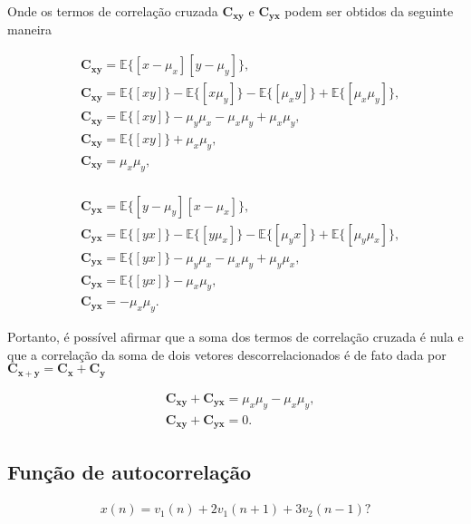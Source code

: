         Onde os termos de correlação cruzada $\mathbf{C}_{\mathbf{xy}}$ e $\mathbf{C}_{\mathbf{yx}}$ podem ser obtidos  da seguinte maneira
        
        \begin{align}
            &\mathbf{C_{xy}} = \mathbb{E}\{[x - \mu_{x}][y - \mu_{y}]\}, \\
            &\mathbf{C_{xy}} = \mathbb{E}\{[xy]\} - \mathbb{E}\{[x\mu_{y}]\} - \mathbb{E}\{[\mu_{x} y]\} + \mathbb{E}\{[\mu_{x} \mu_{y}]\}, \\
            &\mathbf{C_{xy}} = \mathbb{E}\{[xy]\} - \mu_{y} \mu_{x} - \mu_{x} \mu_{y} + \mu_{x} \mu_{y}, \\
            &\mathbf{C_{xy}} = \mathbb{E}\{[xy]\} + \mu_{x} \mu_{y}, \\
            &\mathbf{C_{xy}} = \mu_{x} \mu_{y}, \\
        \end{align}
        
        \begin{align}
            &\mathbf{C_{yx}} = \mathbb{E}\{[y - \mu_{y}][x - \mu_{x}]\}, \\
            &\mathbf{C_{yx}} = \mathbb{E}\{[yx]\} - \mathbb{E}\{[y\mu_{x}]\} - \mathbb{E}\{[\mu_{y} x]\} + \mathbb{E}\{[\mu_{y} \mu_{x}]\}, \\
            &\mathbf{C_{yx}} = \mathbb{E}\{[yx]\} - \mu_{y} \mu_{x} - \mu_{x} \mu_{y} + \mu_{y} \mu_{x}, \\
            &\mathbf{C_{yx}} = \mathbb{E}\{[yx]\} - \mu_{x} \mu_{y}, \\
            &\mathbf{C_{yx}} = - \mu_{x} \mu_{y}.
        \end{align}
        
        Portanto, é possível afirmar que a soma dos termos de correlação cruzada é nula e que a correlação da soma de dois vetores descorrelacionados é de fato 
        dada por $\mathbf{C}_{\mathbf{x} + \mathbf{y}} = \mathbf{C}_{\mathbf{x}} + \mathbf{C}_{\mathbf{y}}$
        
        \begin{align}
            &\mathbf{C_{xy}} + \mathbf{C_{yx}}  = \mu_{x} \mu_{y} - \mu_{x} \mu_{y}, \\
            &\mathbf{C_{xy}} + \mathbf{C_{yx}}  = 0.
        \end{align}
    

\subsection{Função de autocorrelação} %
\begin{align}
    x(n) = v_1(n) + 2v_1(n + 1) + 3v_2(n-1) ?
\end{align}

